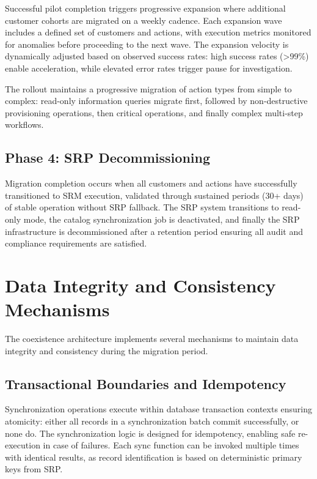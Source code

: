 Successful pilot completion triggers progressive expansion where additional customer cohorts are migrated on a weekly cadence. Each expansion wave includes a defined set of customers and actions, with execution metrics monitored for anomalies before proceeding to the next wave. The expansion velocity is dynamically adjusted based on observed success rates: high success rates (>99\%) enable acceleration, while elevated error rates trigger pause for investigation.

The rollout maintains a progressive migration of action types from simple to complex: read-only information queries migrate first, followed by non-destructive provisioning operations, then critical operations, and finally complex multi-step workflows.

\subsection{Phase 4: SRP Decommissioning}

Migration completion occurs when all customers and actions have successfully transitioned to SRM execution, validated through sustained periods (30+ days) of stable operation without SRP fallback. The SRP system transitions to read-only mode, the catalog synchronization job is deactivated, and finally the SRP infrastructure is decommissioned after a retention period ensuring all audit and compliance requirements are satisfied.

\section{Data Integrity and Consistency Mechanisms}

The coexistence architecture implements several mechanisms to maintain data integrity and consistency during the migration period.

\subsection{Transactional Boundaries and Idempotency}

Synchronization operations execute within database transaction contexts ensuring atomicity: either all records in a synchronization batch commit successfully, or none do. The synchronization logic is designed for idempotency, enabling safe re-execution in case of failures. Each sync function can be invoked multiple times with identical results, as record identification is based on deterministic primary keys from SRP.


